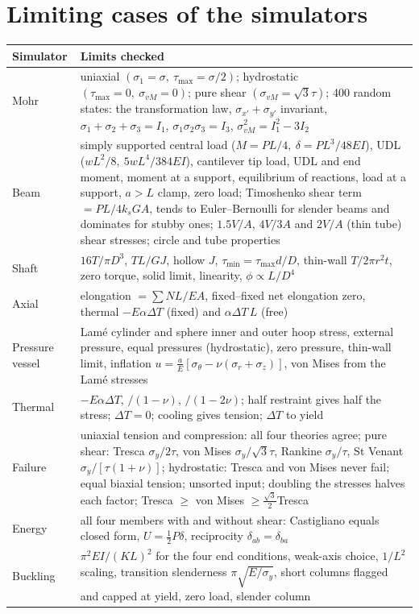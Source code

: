 \section{Limiting cases of the simulators}
\begin{center}\small
\begin{tabular}{@{}p{2.7cm}p{12.3cm}@{}}\toprule
Simulator & Limits checked\\\midrule
Mohr & uniaxial $(\sigma_1=\sigma,\ \tau_{\max}=\sigma/2)$; hydrostatic $(\tau_{\max}=0,\ \sigma_{vM}=0)$; pure shear $(\sigma_{vM}=\sqrt3\tau)$; 400 random states: the transformation law, $\sigma_{x'}+\sigma_{y'}$ invariant, $\sigma_1+\sigma_2+\sigma_3=I_1$, $\sigma_1\sigma_2\sigma_3=I_3$, $\sigma_{vM}^2=I_1^2-3I_2$\\
Beam & simply supported central load ($M=PL/4,\ \delta=PL^3/48EI$), UDL ($wL^2/8,\ 5wL^4/384EI$), cantilever tip load, UDL and end moment, moment at a support, equilibrium of reactions, load at a support, $a>L$ clamp, zero load; Timoshenko shear term $=PL/4k_sGA$, tends to Euler--Bernoulli for slender beams and dominates for stubby ones; $1.5V/A$, $4V/3A$ and $2V/A$ (thin tube) shear stresses; circle and tube properties\\
Shaft & $16T/\pi D^3$, $TL/GJ$, hollow $J$, $\tau_{\min}=\tau_{\max}d/D$, thin-wall $T/2\pi r^2t$, zero torque, solid limit, linearity, $\phi\propto L/D^4$\\
Axial & elongation $=\sum NL/EA$, fixed--fixed net elongation zero, thermal $-E\alpha\Delta T$ (fixed) and $\alpha\Delta T\,L$ (free)\\
Pressure vessel & Lam\'e cylinder and sphere inner and outer hoop stress, external pressure, equal pressures (hydrostatic), zero pressure, thin-wall limit, inflation $u=\frac{a}{E}[\sigma_\theta-\nu(\sigma_r+\sigma_z)]$, von Mises from the Lam\'e stresses\\
Thermal & $-E\alpha\Delta T$, $/(1-\nu)$, $/(1-2\nu)$; half restraint gives half the stress; $\Delta T=0$; cooling gives tension; $\Delta T$ to yield\\
Failure & uniaxial tension and compression: all four theories agree; pure shear: Tresca $\sigma_y/2\tau$, von Mises $\sigma_y/\sqrt3\tau$, Rankine $\sigma_y/\tau$, St Venant $\sigma_y/[\tau(1+\nu)]$; hydrostatic: Tresca and von Mises never fail; equal biaxial tension; unsorted input; doubling the stresses halves each factor; Tresca $\ge$ von Mises $\ge\tfrac{\sqrt3}{2}$Tresca\\
Energy & all four members with and without shear: Castigliano equals closed form, $U=\tfrac12P\delta$, reciprocity $\delta_{ab}=\delta_{ba}$\\
Buckling & $\pi^2EI/(KL)^2$ for the four end conditions, weak-axis choice, $1/L^2$ scaling, transition slenderness $\pi\sqrt{E/\sigma_y}$, short columns flagged and capped at yield, zero load, slender column\\\bottomrule
\end{tabular}
\end{center}


